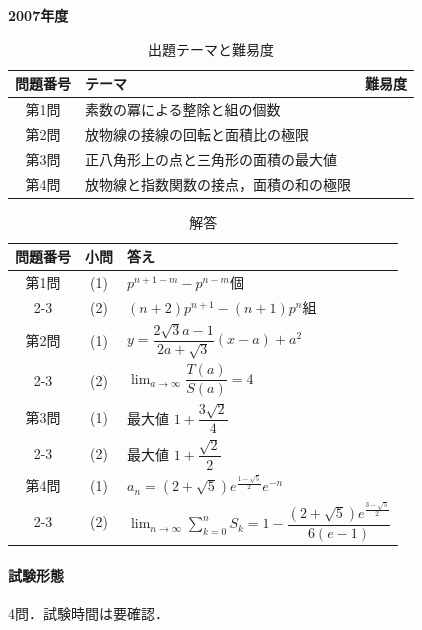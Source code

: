 \documentclass[../../main.tex]{subfiles}
\begin{document}
\begin{center}
  {\fontsize{48pt}{58pt}\selectfont \textbf{2007}\normalsize\textbf{年度}}
\end{center}

\begin{table}[htb]
  \centering
  \caption{出題テーマと難易度}
  \begin{tabular}{|c|p{9cm}|c|}
    \hline
    \textbf{問題番号} & \textbf{テーマ} & \textbf{難易度} \\
    \hline
    第1問 & 素数の冪による整除と組の個数 & \\
    \hline
    第2問 & 放物線の接線の回転と面積比の極限 & \\
    \hline
    第3問 & 正八角形上の点と三角形の面積の最大値 & \\
    \hline
    第4問 & 放物線と指数関数の接点，面積の和の極限 & \\
    \hline
  \end{tabular}
\end{table}

\begin{table}[htb]
  \centering
  \caption{解答}
  \renewcommand{\arraystretch}{1.4}
  \begin{tabular}{|c|c|p{9cm}|}
    \hline
    \textbf{問題番号} & \textbf{小問} & \textbf{答え} \\
    \hline
    第1問 & (1) & $p^{n+1-m}-p^{n-m}$個 \\
    \cline{2-3}
    & (2) & $(n+2)p^{n+1}-(n+1)p^n$組 \\
    \hline
    第2問 & (1) & $y=\dfrac{2\sqrt{3}a-1}{2a+\sqrt{3}}(x-a)+a^2$ \\
    \cline{2-3}
    & (2) & $\displaystyle\lim_{a\to\infty}\dfrac{T(a)}{S(a)}=4$ \\
    \hline
    第3問 & (1) & 最大値 $1+\dfrac{3\sqrt{2}}{4}$ \\
    \cline{2-3}
    & (2) & 最大値 $1+\dfrac{\sqrt{2}}{2}$ \\
    \hline
    第4問 & (1) & $a_n=(2+\sqrt{5})e^{\frac{1-\sqrt{5}}{2}}e^{-n}$ \\
    \cline{2-3}
    & (2) & $\displaystyle\lim_{n\to\infty}\sum_{k=0}^{n}S_k
    =1-\dfrac{(2+\sqrt{5})e^{\frac{3-\sqrt{5}}{2}}}{6(e-1)}$ \\
    \hline
  \end{tabular}
\end{table}

\paragraph{試験形態}
4問．試験時間は要確認．
\end{document}
